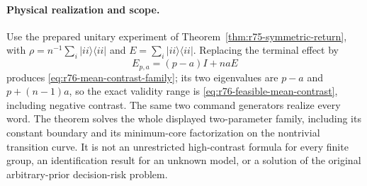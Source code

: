 \paragraph{Physical realization and scope.}
Use the prepared unitary experiment of
Theorem~\ref{thm:r75-symmetric-return}, with
$\rho=n^{-1}\sum_i|ii\rangle\langle ii|$ and
$E=\sum_i|ii\rangle\langle ii|$. Replacing the terminal effect by
\[
 E_{p,a}=(p-a)I+naE
\]
produces \eqref{eq:r76-mean-contrast-family}; its two eigenvalues are
$p-a$ and $p+(n-1)a$, so the exact validity range is
\eqref{eq:r76-feasible-mean-contrast}, including negative contrast.
The same two command generators realize every word.
The theorem solves the whole displayed two-parameter family, including
its constant boundary and its minimum-core factorization on the
nontrivial transition curve. It is not an unrestricted high-contrast
formula for every finite group, an identification result for an unknown
model, or a solution of the original arbitrary-prior decision-risk problem.

